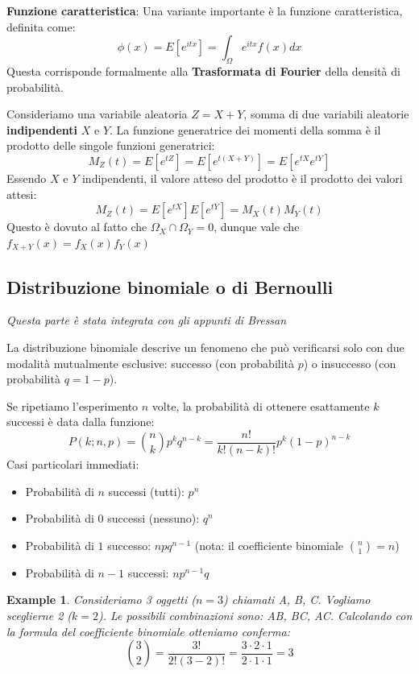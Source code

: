 \documentclass{article}
\newtheorem{example}{Example}
\theoremstyle{remark}
\begin{document}
\begin{definizione}
    \textbf{Funzione caratteristica}:
    Una variante importante è la funzione caratteristica, definita come:
    \[
    \phi (x) = E[e^{itx}] = \int_\Omega e^{itx}f(x) dx
    \]
    Questa corrisponde formalmente alla \textbf{Trasformata di Fourier} della densità di probabilità.
\end{definizione}
Consideriamo una variabile aleatoria $Z = X + Y$, somma di due variabili aleatorie \textbf{indipendenti} $X$ e $Y$.
La funzione generatrice dei momenti della somma è il prodotto delle singole funzioni generatrici:
\[
M_Z(t) = E[e^{tZ}] = E[e^{t(X+Y)}] = E[e^{tX}e^{tY}]
\]
Essendo $X$ e $Y$ indipendenti, il valore atteso del prodotto è il prodotto dei valori attesi:
\[
M_Z(t) = E[e^{tX}]E[e^{tY}] = M_X(t)M_Y(t)
\]
Questo è dovuto al fatto che $\Omega_X \cap \Omega_Y=0$, dunque vale che $f_{X+Y}(x)=f_X(x) f_Y(x)$

\subsection{Distribuzione binomiale o di Bernoulli}
\emph{Questa parte è stata integrata con gli appunti di Bressan}
\vspace{0.4 cm}

La distribuzione binomiale descrive un fenomeno che può verificarsi solo con due modalità mutualmente esclusive: successo (con probabilità $p$) o insuccesso (con probabilità $q=1-p$).

Se ripetiamo l'esperimento $n$ volte, la probabilità di ottenere esattamente $k$ successi è data dalla funzione:
\[
P(k;n,p) = \binom{n}{k}p^k q^{n-k} = \frac{n!}{k!(n-k)!}p^k (1-p)^{n-k}
\]
Casi particolari immediati:
\begin{itemize}[itemsep=0.1em]
 \item Probabilità di $n$ successi (tutti): $p^n$ 
 \item Probabilità di $0$ successi (nessuno): $q^n$  
 \item Probabilità di $1$ successo: $n p q^{n-1}$ (nota: il coefficiente binomiale $\binom{n}{1}=n$)
 \item Probabilità di $n-1$ successi: $n p^{n-1}q$
\end{itemize}

\begin{example}
    Consideriamo 3 oggetti ($n=3$) chiamati A, B, C. Vogliamo sceglierne 2 ($k=2$). 
    Le possibili combinazioni sono: AB, BC, AC.
    Calcolando con la formula del coefficiente binomiale otteniamo conferma:
    \[
    \binom{3}{2} = \frac{3!}{2!(3-2)!} = \frac{3 \cdot 2 \cdot 1}{2 \cdot 1 \cdot 1} = 3
    \]
\end{example}
\end{document}
